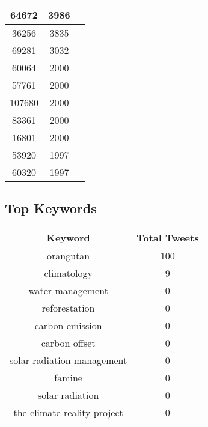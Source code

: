 \documentclass{article}\usepackage[T1]{fontenc}
\begin{document}
\begin{tabular}{|c|c|c|}
 \hline
64672 & 3986\\ 
 \hline
36256 & 3835\\ 
 \hline
69281 & 3032\\ 
 \hline
60064 & 2000\\ 
 \hline
57761 & 2000\\ 
 \hline
107680 & 2000\\ 
 \hline
83361 & 2000\\ 
 \hline
16801 & 2000\\ 
 \hline
53920 & 1997\\ 
 \hline
60320 & 1997\\ 
 \hline
\end{tabular}\subsection*{Top Keywords}\begin{tabular}{|c|c|}         \hline         Keyword & Total Tweets \\ 
 \hline
orangutan & 100\\ 
 \hline
climatology & 9\\ 
 \hline
water management & 0\\ 
 \hline
reforestation & 0\\ 
 \hline
carbon emission & 0\\ 
 \hline
carbon offset & 0\\ 
 \hline
solar radiation management & 0\\ 
 \hline
famine & 0\\ 
 \hline
solar radiation & 0\\ 
 \hline
the climate reality project & 0\\ 
 \hline
\end{tabular}
\end{document}
